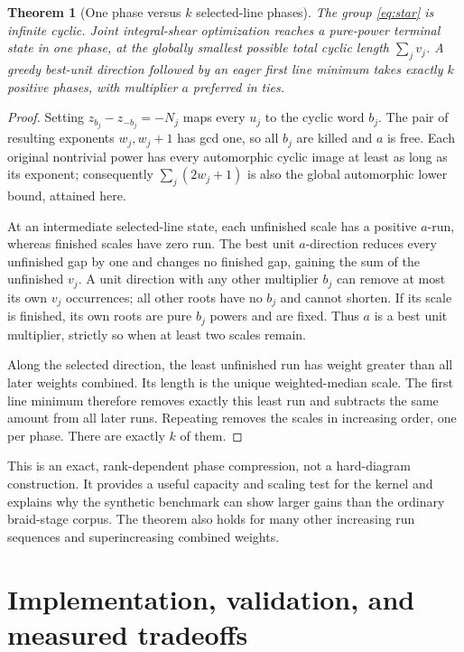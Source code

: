 \documentclass[11pt,letterpaper]{article}
\newtheorem{theorem}{Theorem}[section]
\theoremstyle{definition}
\theoremstyle{remark}\newtheorem{remark}[theorem]{Remark}
\begin{document}
\begin{theorem}[One phase versus $k$ selected-line phases]
The group \eqref{eq:star} is infinite cyclic. Joint integral-shear optimization
reaches a pure-power terminal state in one phase, at the globally smallest
possible total cyclic length $\sum_jv_j$. A greedy best-unit direction
followed by an eager first line minimum takes exactly $k$ positive phases,
with multiplier $a$ preferred in ties.
\end{theorem}
\begin{proof}
Setting $z_{b_j}-z_{-b_j}=-N_j$ maps every $u_j$ to the cyclic word $b_j$.
The pair of resulting exponents $w_j,w_j+1$ has gcd one, so all $b_j$ are
killed and $a$ is free. Each original nontrivial power has every automorphic
cyclic image at least as long as its exponent; consequently
$\sum_j(2w_j+1)$ is also the global automorphic lower bound, attained here.

At an intermediate selected-line state, each unfinished scale has a positive
$a$-run, whereas finished scales have zero run. The best unit $a$-direction
reduces every unfinished gap by one and changes no finished gap, gaining the
sum of the unfinished $v_j$. A unit direction with any other multiplier
$b_j$ can remove at most its own $v_j$ occurrences; all other roots have no
$b_j$ and cannot shorten. If its scale is finished, its own roots are pure
$b_j$ powers and are fixed. Thus $a$ is a best unit multiplier, strictly so
when at least two scales remain.

Along the selected direction, the least unfinished run has weight greater
than all later weights combined. Its length is the unique weighted-median
scale. The first line minimum therefore removes exactly this least run and
subtracts the same amount from all later runs. Repeating removes the scales
in increasing order, one per phase. There are exactly $k$ of them.
\end{proof}

This is an exact, rank-dependent phase compression, not a hard-diagram
construction. It provides a useful capacity and scaling test for the kernel
and explains why the synthetic benchmark can show larger gains than the
ordinary braid-stage corpus. The theorem also holds for many other increasing
run sequences and superincreasing combined weights.

\section{Implementation, validation, and measured tradeoffs}
\label{sec:experiments}
\end{document}
